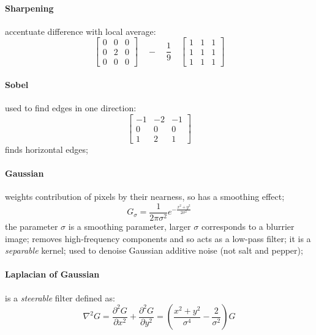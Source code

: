 \documentclass[a4paper,twocolumn]{article}
\begin{document}
\paragraph{Sharpening} accentuate difference with local average:
	\begin{equation}
		\begin{bmatrix}
			0 & 0 & 0 \\
			0 & 2 & 0 \\
			0 & 0 & 0
		\end{bmatrix}
		\quad - \quad \frac{1}{9} \quad \begin{bmatrix}
			1 & 1 & 1 \\
			1 & 1 & 1 \\
			1 & 1 & 1
		\end{bmatrix}
	\end{equation}
\paragraph{Sobel} used to find edges in one direction:
	\begin{equation}
		\begin{bmatrix}
			-1 & -2 & -1 \\
			 0 &  0 &  0 \\
			 1 &  2 &  1
		\end{bmatrix}
	\end{equation}
	finds horizontal edges;
\paragraph{Gaussian} weights contribution of pixels by their nearness, so has a
	smoothing effect;
	\begin{equation}
		G_{\sigma} = \frac{1}{2\pi\sigma^2}e^{-\frac{x^2+y^2}{2\sigma^2}}
	\end{equation}
	the parameter $\sigma$ is a smoothing parameter, larger $\sigma$ corresponds
	to a blurrier image; removes high-frequency components and so acts as a
	low-pass filter; it is a \textit{separable} kernel; used to denoise Gaussian
	additive noise (not salt and pepper);
\paragraph{Laplacian of Gaussian} is a \textit{steerable} filter defined as:
	\begin{equation} \label{eq:log}
		\nabla^2 G = \frac{\partial^2 G}{\partial x^2} + \frac{\partial^2 G}{\partial y^2}
		= \left(\frac{x^2 + y^2}{\sigma^4} - \frac{2}{\sigma^2}\right) G
	\end{equation}
\end{document}
